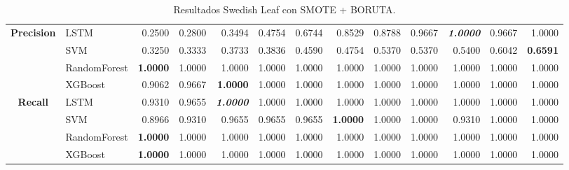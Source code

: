 \begin{table}[H]
\begin{adjustbox}{max width=12cm}
\begin{tabular}{|c|l|r|r|r|r|r|r|r|r|r|r|r|}
		\hline
		\textbf{Precision} &  LSTM &  0.2500 &  0.2800 &  0.3494 &  0.4754 &  0.6744 &  0.8529 &  0.8788 &  0.9667 & \textit{ \textbf{  1.0000 } } &  0.9667 &  1.0000 \\
		&  SVM &  0.3250 &  0.3333 &  0.3733 &  0.3836 &  0.4590 &  0.4754 &  0.5370 &  0.5370 &  0.5400 &  0.6042 & \textbf{  0.6591 } \\
		&  RandomForest & \textbf{  1.0000 } &  1.0000 &  1.0000 &  1.0000 &  1.0000 &  1.0000 &  1.0000 &  1.0000 &  1.0000 &  1.0000 &  1.0000 \\
		&  XGBoost &  0.9062 &  0.9667 & \textbf{  1.0000 } &  1.0000 &  1.0000 &  1.0000 &  1.0000 &  1.0000 &  1.0000 &  1.0000 &  1.0000 \\
		\hline
		\textbf{Recall} &  LSTM &  0.9310 &  0.9655 & \textit{ \textbf{  1.0000 } } &  1.0000 &  1.0000 &  1.0000 &  1.0000 &  1.0000 &  1.0000 &  1.0000 &  1.0000 \\
		&  SVM &  0.8966 &  0.9310 &  0.9655 &  0.9655 &  0.9655 & \textbf{  1.0000 } &  1.0000 &  1.0000 &  0.9310 &  1.0000 &  1.0000 \\
		&  RandomForest & \textbf{  1.0000 } &  1.0000 &  1.0000 &  1.0000 &  1.0000 &  1.0000 &  1.0000 &  1.0000 &  1.0000 &  1.0000 &  1.0000 \\
		&  XGBoost & \textbf{  1.0000 } &  1.0000 &  1.0000 &  1.0000 &  1.0000 &  1.0000 &  1.0000 &  1.0000 &  1.0000 &  1.0000 &  1.0000 \\
		\hline
	\end{tabular}
\end{adjustbox}
\caption{Resultados Swedish Leaf con SMOTE + BORUTA.}
\label{tab:SLeaf_SMOTE_BORUTA}
\end{table}

